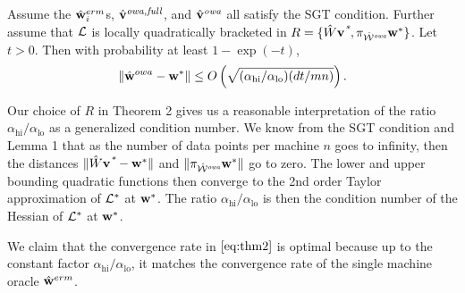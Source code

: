\documentclass[thesis.tex]{subfiles}
\newcommand{\qhi}{\alpha_\text{hi}}
\newcommand{\qlo}{\alpha_\text{lo}}
\begin{document}
\begin{theorem}
\label{theorem:wowafull}
Assume the $\hat{\mathbf w}^{erm}_i$s, $\hat{\mathbf{v}}^{\textit{owa,full}}$, and $\hat{\mathbf{v}}^{\textit{owa}}$ all satisfy the SGT condition.
Further assume that $\mathcal{L}$ is locally quadratically bracketed in $R=\{\hat W\mathbf{v}^{\textit{*}},\pi_{{{\hat {{\mathcal W}}^{\textit{owa}}}}}{\mathbf w^{*}}\}$.
Let $t>0$.
Then with probability at least $1-\exp(-t)$, 
\begin{equation}
    \label{eq:thm2}
\ltwo{\wowa-\wstar} \le O\left(
\sqrt{({\qhi}/{\qlo})({dt}/{mn})}
\right)
.
\end{equation}
\end{theorem}

Our choice of $R$ in Theorem 2 gives us a reasonable interpretation of the ratio $\qhi/\qlo$ as a generalized condition number.
We know from the SGT condition and Lemma 1 that as the number of data points per machine $n$ goes to infinity,
then the distances ${\lVert {\hat W\mathbf{v}^{\textit{*}}-{\mathbf w^{*}}} \rVert}$ and ${\lVert {\pi_{{{\hat {{\mathcal W}}^{\textit{owa}}}}}{\mathbf w^{*}}} \rVert}$ go to zero.
The lower and upper bounding quadratic functions then converge to the 2nd order Taylor approximation of $\mathcal{L}^*$ at ${\mathbf w^{*}}$.
The ratio $\qhi/\qlo$ is then the condition number of the Hessian of $\mathcal{L}^*$ at ${\mathbf w^{*}}$.

We claim that the convergence rate in $\eqref{eq:thm2}$ is optimal because up to the constant factor $\qhi/\qlo$, it matches the convergence rate of the single machine oracle $\hat{\mathbf w}^{erm}$.


\end{document}
